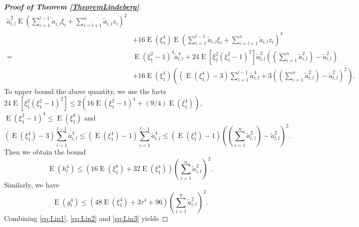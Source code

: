 \documentclass[smallextended]{svjour3}       %
\DeclareMathOperator{\myE}{E}
\begin{document}
\begin{proof}[\textbf{Proof of Theorem \ref{TheoremLindeberg}}]
\begin{equation*}
\begin{split}
        \tilde a_{l,l}^2
        \myE \left( 
        \sum_{i=1}^{l-1} \tilde a_{i,l} \xi_i 
        +\sum_{i =l +1}^n \tilde a_{i,l} z_i 
        \right)^2
        \\
        &+
        16 \myE (\xi_1^4 )
        \myE \left( 
        \sum_{i=1}^{l-1} \tilde a_{i,l} \xi_i 
        +\sum_{i =l +1}^n \tilde a_{i,l} z_i 
    \right)^4
    \\
    =&
        \myE (\xi_1^2 - 1)^4 \tilde a_{l,l}^4
        + 24 \myE [ \xi_1^2(\xi_1^2 -1)^2]
        \tilde a_{l,l}^2
    \left((\sum_{i=1}^n \tilde a_{i,l}^2) - \tilde a_{l,l}^2\right)
        \\
        &+
        16 \myE (\xi_1^4 )
    \left(
        \left(\myE (\xi_1^4) - 3\right)\sum_{i=1}^{l-1} \tilde a_{i,l}^4 
        + 3 \left( (\sum_{i=1}^n \tilde a_{i,l}^2) - \tilde a_{l,l}^2 \right)^2
    \right)
    .
    \end{split}
\end{equation*}
To upper bound the above quantity, we use the facts
$
24 \myE [ \xi_1^2(\xi_1^2 -1)^2]
\leq 
2(16\myE (\xi_1^2 -1)^4 + (9/4) \myE  (\xi_1^4) )
$,
$\myE (\xi_1^2 - 1)^4\leq \myE (\xi_1^8)$ and
\begin{equation*}
        \left(\myE (\xi_1^4) - 3\right)\sum_{i=1}^{l-1} \tilde a_{i,l}^4 
        \leq
        \left(\myE (\xi_1^4) - 1\right)\sum_{i=1}^{l-1} \tilde a_{i,l}^4 
        \leq
        \left(\myE (\xi_1^4) - 1\right)
        \left( (\sum_{i=1}^n \tilde a_{i,l}^2) - \tilde a_{l,l}^2 \right)^2
        .
\end{equation*}
Then we obtain the bound 
\begin{equation}\label{eq:Lin2}
\myE (h_l^4) \leq \left(16 \myE (\xi_1^8) + 32 \myE (\xi_1^4)\right) \left(\sum_{i=1}^n \tilde a_{i,l}^2\right)^2.
\end{equation}
Similarly, we have
\begin{equation}\label{eq:Lin3}
\myE (g_l^4) \leq \left(  48 \myE (\xi_1^4) + 3\tau^4 + 96 \right) \left(\sum_{i=1}^n \tilde a_{i,l}^2\right)^2.
\end{equation}
Combining \eqref{eq:Lin1}, \eqref{eq:Lin2} and \eqref{eq:Lin3} yields


\end{proof}
\end{document}
